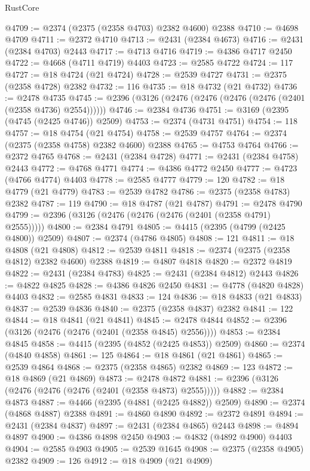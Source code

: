 \begin{lexlean}{RustCore}
\begin{coremodule}
@4709 := @2374 (@2375 (@2358 @4703) @2382 @4600) @2388
@4710 := @4698 @4709
@4711 := @2372 @4710
@4713 := @2431 (@2384 @4673)
@4716 := @2431 (@2384 @4703) @2443
@4717 := @4713 @4716
@4719 := @4386 @4717 @2450
@4722 := @4668 (@4711 @4719) @4403
@4723 := @2585 @4722
@4724 := 117
@4727 := @18 @4724 (@21 @4724)
@4728 := @2539 @4727
@4731 := @2375 (@2358 @4728) @2382
@4732 := 116
@4735 := @18 @4732 (@21 @4732)
@4736 := @2478 @4735
@4745 := @2396 (@3126 (@2476 (@2476 (@2476 (@2476 (@2401 (@2358 @4736) @2554))))))
@4746 := @2384 @4736
@4751 := @3169 (@2395 (@4745 (@2425 @4746)) @2509)
@4753 := @2374 (@4731 @4751)
@4754 := 118
@4757 := @18 @4754 (@21 @4754)
@4758 := @2539 @4757
@4764 := @2374 (@2375 (@2358 @4758) @2382 @4600) @2388
@4765 := @4753 @4764
@4766 := @2372 @4765
@4768 := @2431 (@2384 @4728)
@4771 := @2431 (@2384 @4758) @2443
@4772 := @4768 @4771
@4774 := @4386 @4772 @2450
@4777 := @4723 (@4766 @4774) @4403
@4778 := @2585 @4777
@4779 := 120
@4782 := @18 @4779 (@21 @4779)
@4783 := @2539 @4782
@4786 := @2375 (@2358 @4783) @2382
@4787 := 119
@4790 := @18 @4787 (@21 @4787)
@4791 := @2478 @4790
@4799 := @2396 (@3126 (@2476 (@2476 (@2476 (@2401 (@2358 @4791) @2555)))))
@4800 := @2384 @4791
@4805 := @4415 (@2395 (@4799 (@2425 @4800)) @2509)
@4807 := @2374 (@4786 @4805)
@4808 := 121
@4811 := @18 @4808 (@21 @4808)
@4812 := @2539 @4811
@4818 := @2374 (@2375 (@2358 @4812) @2382 @4600) @2388
@4819 := @4807 @4818
@4820 := @2372 @4819
@4822 := @2431 (@2384 @4783)
@4825 := @2431 (@2384 @4812) @2443
@4826 := @4822 @4825
@4828 := @4386 @4826 @2450
@4831 := @4778 (@4820 @4828) @4403
@4832 := @2585 @4831
@4833 := 124
@4836 := @18 @4833 (@21 @4833)
@4837 := @2539 @4836
@4840 := @2375 (@2358 @4837) @2382
@4841 := 122
@4844 := @18 @4841 (@21 @4841)
@4845 := @2478 @4844
@4852 := @2396 (@3126 (@2476 (@2476 (@2401 (@2358 @4845) @2556))))
@4853 := @2384 @4845
@4858 := @4415 (@2395 (@4852 (@2425 @4853)) @2509)
@4860 := @2374 (@4840 @4858)
@4861 := 125
@4864 := @18 @4861 (@21 @4861)
@4865 := @2539 @4864
@4868 := @2375 (@2358 @4865) @2382
@4869 := 123
@4872 := @18 @4869 (@21 @4869)
@4873 := @2478 @4872
@4881 := @2396 (@3126 (@2476 (@2476 (@2476 (@2401 (@2358 @4873) @2555)))))
@4882 := @2384 @4873
@4887 := @4466 (@2395 (@4881 (@2425 @4882)) @2509)
@4890 := @2374 (@4868 @4887) @2388
@4891 := @4860 @4890
@4892 := @2372 @4891
@4894 := @2431 (@2384 @4837)
@4897 := @2431 (@2384 @4865) @2443
@4898 := @4894 @4897
@4900 := @4386 @4898 @2450
@4903 := @4832 (@4892 @4900) @4403
@4904 := @2585 @4903
@4905 := @2539 @1645
@4908 := @2375 (@2358 @4905) @2382
@4909 := 126
@4912 := @18 @4909 (@21 @4909)

\end{coremodule}
\end{lexlean}
